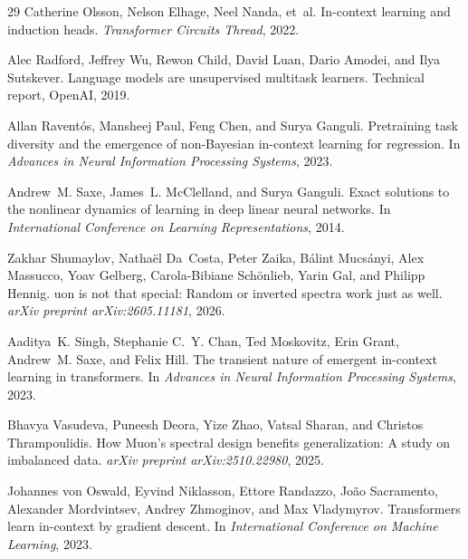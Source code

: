 \documentclass{article}
\begin{document}
\begin{thebibliography}{29}
Catherine Olsson, Nelson Elhage, Neel Nanda, et~al.
\newblock In-context learning and induction heads.
\newblock \emph{Transformer Circuits Thread}, 2022.

Alec Radford, Jeffrey Wu, Rewon Child, David Luan, Dario Amodei, and Ilya
  Sutskever.
\newblock Language models are unsupervised multitask learners.
\newblock Technical report, OpenAI, 2019.

Allan Ravent{\'o}s, Mansheej Paul, Feng Chen, and Surya Ganguli.
\newblock Pretraining task diversity and the emergence of non-{B}ayesian
  in-context learning for regression.
\newblock In \emph{Advances in Neural Information Processing Systems}, 2023.

Andrew~M. Saxe, James~L. McClelland, and Surya Ganguli.
\newblock Exact solutions to the nonlinear dynamics of learning in deep linear
  neural networks.
\newblock In \emph{International Conference on Learning Representations}, 2014.

Zakhar Shumaylov, Nathaël Da~Costa, Peter Zaika, Bálint Mucsányi, Alex
  Massucco, Yoav Gelberg, Carola-Bibiane Schönlieb, Yarin Gal, and Philipp
  Hennig.
uon is not that special: Random or inverted spectra work just as
  well.
\newblock \emph{arXiv preprint arXiv:2605.11181}, 2026.

Aaditya~K. Singh, Stephanie C.~Y. Chan, Ted Moskovitz, Erin Grant, Andrew~M.
  Saxe, and Felix Hill.
\newblock The transient nature of emergent in-context learning in transformers.
\newblock In \emph{Advances in Neural Information Processing Systems}, 2023.

Bhavya Vasudeva, Puneesh Deora, Yize Zhao, Vatsal Sharan, and Christos
  Thrampoulidis.
\newblock How {M}uon's spectral design benefits generalization: A study on
  imbalanced data.
\newblock \emph{arXiv preprint arXiv:2510.22980}, 2025.

Johannes von Oswald, Eyvind Niklasson, Ettore Randazzo, Jo{\~a}o Sacramento,
  Alexander Mordvintsev, Andrey Zhmoginov, and Max Vladymyrov.
\newblock Transformers learn in-context by gradient descent.
\newblock In \emph{International Conference on Machine Learning}, 2023.


\end{thebibliography}
\end{document}
